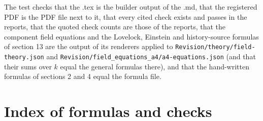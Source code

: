 \documentclass[11pt]{article}
\begin{document}
The test checks that the .tex is the builder output of the .md, that the registered PDF is the PDF file next to it, that every cited check exists and passes in the reports, that the quoted check counts are those of the reports, that the component field equations and the Lovelock, Einstein and history-source formulas of section 13 are the output of its renderers applied to \texttt{Revision\allowbreak{}/theory/\allowbreak{}field-th\allowbreak{}eory.jso\allowbreak{}n} and \texttt{Revision\allowbreak{}/field\_e\allowbreak{}quations\allowbreak{}\_a4/a4-e\allowbreak{}quations\allowbreak{}.json} (and that their sums over $k$ equal the general formulas there), and that the hand-written formulas of sections 2 and 4 equal the formula file.

\section{Index of formulas and checks}
\end{document}
